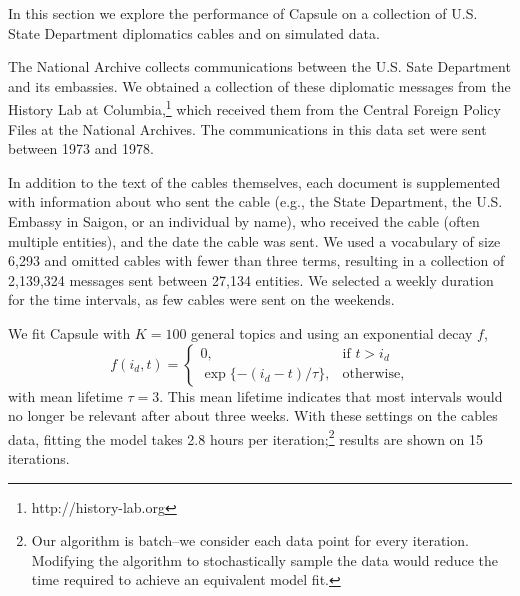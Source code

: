 




In this section we explore the performance of Capsule on a collection of U.S. State Department diplomatics cables and on simulated data.

The National Archive collects communications between the U.S. Sate Department and its embassies.  We obtained a collection of these diplomatic messages from the History Lab at Columbia,\footnote{http://history-lab.org} which received them from the Central Foreign Policy Files at the National Archives.  The communications in this data set were sent between 1973 and 1978.

In addition to the text of the cables themselves, each document is supplemented with information about who sent the cable (e.g., the State Department, the U.S. Embassy in Saigon, or an individual by name), who received the cable (often multiple entities), and the date the cable was sent.  We used a vocabulary of size 6,293 and omitted cables with fewer than three terms, resulting in a collection of 2,139,324 messages sent between 27,134 entities.  We selected a weekly duration for the time intervals, as few cables were sent on the weekends.

We fit Capsule with $K=100$ general topics and using an exponential decay $f$,
\begin{equation}
f(i_d, t) = 
\begin{cases}
    0,			& \text{if } t > i_d\\
    \exp\{-(i_d - t) / \tau\},          & \text{otherwise,}
\end{cases}
\label{eq:f}
\end{equation}
with mean lifetime $\tau=3$.  This mean lifetime indicates that most intervals would no longer be relevant after about three weeks.  With these settings on the cables data, fitting the model takes 2.8 hours per iteration;\footnote{Our algorithm is batch--we consider each data point for every iteration.  Modifying the algorithm to stochastically sample the data would reduce the time required to achieve an equivalent model fit.} results are shown on 15 iterations.

